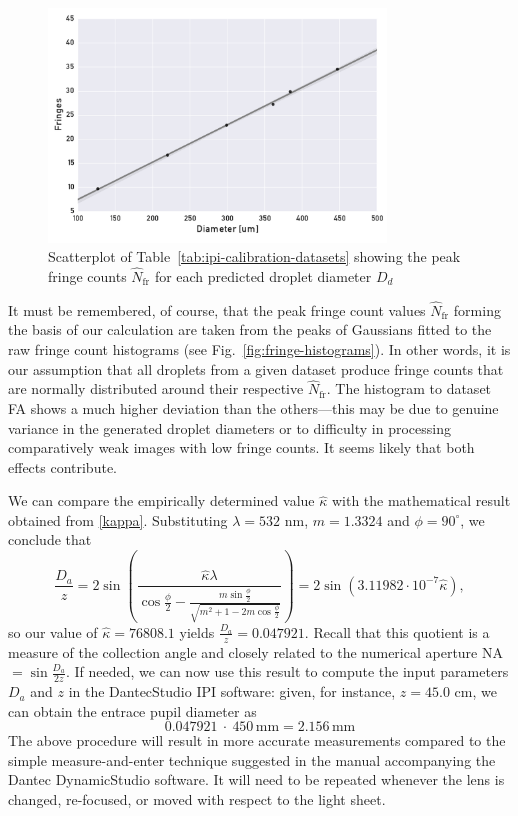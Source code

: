 \documentclass[11.5pt,oneside]{book}
\newcommand*{\figref}[1]{Fig.~\ref{#1}}
\newcommand*{\tableref}[1]{Table~\ref{#1}}
\begin{document}
\begin{figure}[ht!]
    \centering
    \includegraphics[width=0.8\textwidth]{img/fringe_regression.pdf}
    \caption{Scatterplot of \tableref{tab:ipi-calibration-datasets} showing the peak fringe counts $\hat{N}_\text{fr}$ for each predicted droplet diameter $D_d$}
    \label{fig:fringe-regression}
\end{figure}
It must be remembered, of course, that the peak fringe count values
$\hat{N}_\text{fr}$ forming the basis of our calculation are taken from the
peaks of Gaussians fitted to the raw fringe count histograms (see
\figref{fig:fringe-histograms}). In other words, it is our assumption that all
droplets from a given dataset produce fringe counts that are normally
distributed around their respective $\hat{N}_\text{fr}$. The histogram to
dataset FA shows a much higher deviation than the others---this may be due to
genuine variance in the generated droplet diameters or to difficulty in
processing comparatively weak images with low fringe counts. It seems likely
that both effects contribute.

We can compare the empirically determined value $\hat{\kappa}$ with the
mathematical result obtained from \eqref{kappa}. Substituting $\lambda = 532$
nm, $m = 1.3324$ and $\phi = 90^\circ$, we conclude that
\begin{equation}
    \frac{D_a}{z} = 2 \sin \left( \frac{\hat{\kappa} \lambda}{\cos
    \frac{\phi}{2} - \frac{ m \sin \frac{\phi}{2}}{\sqrt{m^2 + 1 - 2m \cos
    \frac{\phi}{2}}}} \right) = 2\sin (3.11982 \cdot 10^{-7} \hat{\kappa}),
\end{equation}
so our value of $\hat{\kappa} = 76808.1$ yields $\frac{D_a}{z} = 0.047921$. Recall that this
quotient is a measure of the collection angle and closely related to the
numerical aperture NA$=\sin \frac{D_a}{2z}$. If needed, we can now use this
result to compute the input parameters $D_a$ and $z$ in the DantecStudio IPI
software: given, for instance, $z = 45.0$ cm, we can obtain the entrace pupil
diameter as
\begin{equation}
    0.047921~\cdot~450\,\mathrm{mm} = 2.156\,\mathrm{mm}
\end{equation}
The above procedure will result in more accurate measurements compared to the
simple measure-and-enter technique suggested in the manual accompanying the
Dantec DynamicStudio software. It will need to be repeated whenever the lens is
changed, re-focused, or moved with respect to the light sheet.
\end{document}
